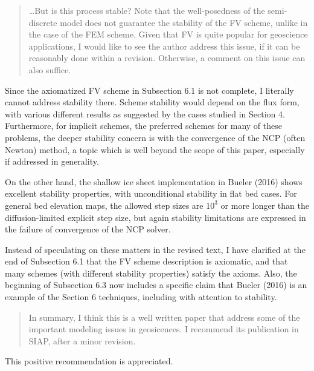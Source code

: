 \documentclass[12pt]{amsart}
\begin{document}
\begin{quote}
\dots  But is this process stable? Note that the well-posedness of the semi-discrete model does not guarantee the stability of the FV scheme, unlike in the case of the FEM scheme.  Given that FV is quite popular for geoscience applications, I would like to see the author address this issue, if it can be reasonably done within a revision. Otherwise, a comment on this issue can also suffice.
\end{quote}

Since the axiomatized FV scheme in Subsection 6.1 is not complete, I literally cannot address stability there.  Scheme stability would depend on the flux form, with various different results as suggested by the cases studied in Section 4.  Furthermore, for implicit schemes, the preferred schemes for many of these problems, the deeper stability concern is with the convergence of the NCP (often Newton) method, a topic which is well beyond the scope of this paper, especially if addressed in generality.

On the other hand, the shallow ice sheet implementation in Bueler (2016) shows excellent stability properties, with unconditional stability in flat bed cases.  For general bed elevation maps, the allowed step sizes are $10^3$ or more longer than the diffusion-limited explicit step size, but again stability limitations are expressed in the failure of convergence of the NCP solver.

Instead of speculating on these matters in the revised text, I have clarified at the end of Subsection 6.1 that the FV scheme description is axiomatic, and that many schemes (with different stability properties) satisfy the axioms.  Also, the beginning of Subsection 6.3 now includes a specific claim that Bueler (2016) is an example of the Section 6 techniques, including with attention to stability.

\begin{quote}
In summary, I think this is a well written paper that address some of the important modeling issues in geosicences.  I recommend its publication in SIAP, after a minor revision.
\end{quote}

This positive recommendation is appreciated.
\end{document}
